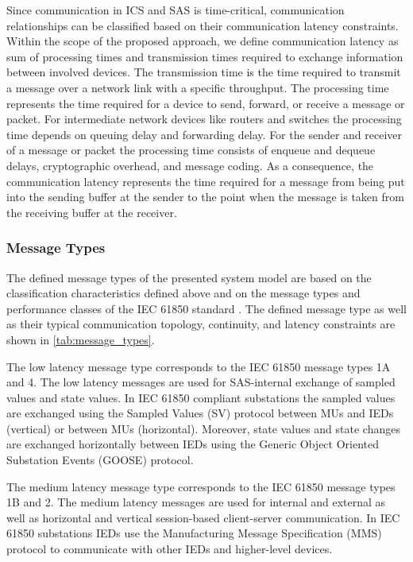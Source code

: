 Since communication in ICS and SAS is time-critical, communication relationships can be classified based on their communication latency constraints.
Within the scope of the proposed approach, we define communication latency as sum of processing times and transmission times required to exchange information between involved devices.
The transmission time is the time required to transmit a message over a network link with a specific throughput.
The processing time represents the time required for a device to send, forward, or receive a message or packet.
For intermediate network devices like routers and switches the processing time depends on queuing delay and forwarding delay.
For the sender and receiver of a message or packet the processing time consists of enqueue and dequeue delays, cryptographic overhead, and message coding.
As a consequence, the communication latency represents the time required for a message from being put into the sending buffer at the sender to the point when the message is taken from the receiving buffer at the receiver.

\subsubsection{Message Types}
The defined message types of the presented system model are based on the classification characteristics defined above and on the message types and performance classes of the IEC 61850 standard \cite{IEC61850P5}.
The defined message type as well as their typical communication topology, continuity, and latency constraints are shown in \autoref{tab:message_types}.

The low latency message type corresponds to the IEC 61850 \cite{IEC61850P5} message types 1A and 4.
The low latency messages are used for SAS-internal exchange of sampled values and state values.
In IEC 61850 compliant substations the sampled values are exchanged using the Sampled Values (SV) protocol between MUs and IEDs (vertical) or between MUs (horizontal).
Moreover, state values and state changes are exchanged horizontally between IEDs using the Generic Object Oriented Substation Events (GOOSE) protocol.

The medium latency message type corresponds to the IEC 61850 message types 1B and 2.
The medium latency messages are used for internal and external as well as horizontal and vertical session-based client-server communication.
In IEC 61850 substations IEDs use the Manufacturing Message Specification (MMS) protocol to communicate with other IEDs and higher-level devices.

